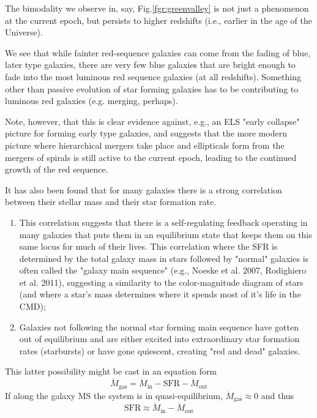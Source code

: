 \par The bimodality we observe in, say, Fig.\ref{fgr:greenvalley}  is not just a phenomenon at the current epoch, but persists to higher redshifts (i.e., earlier in the age of the Universe).
\par We see that while fainter red-sequence galaxies can come from the fading of blue, later type galaxies, there are very few blue galaxies that are bright enough to fade into the most luminous red sequence galaxies (at all redshifts). Something other than passive evolution of star forming galaxies has to be contributing to luminous red galaxies (e.g. merging, perhaps).
\par Note, however, that this is clear evidence against, e.g., an ELS "early collapse" picture for forming early type galaxies, and suggests that the more modern picture where hierarchical mergers take place and ellipticals form from the mergers of spirals is still active to the current epoch, leading to the continued growth of the red sequence.
\par It has also been found that for many galaxies there is a strong correlation between their stellar mass and their star formation rate.
\begin{enumerate}
    \item This correlation suggests that there is a self-regulating feedback operating in many galaxies that puts them in an equilibrium state that keeps them on this same locus for much of their lives. This correlation where the SFR is determined by the total galaxy mass in stars followed by "normal" galaxies is often called the "galaxy main sequence" (e.g., Noeske et al. 2007, Rodighiero et al. 2011), suggesting a similarity to the color-magnitude diagram of stars (and where a star's mass determines where it spends most of it's life in the CMD);
    \item Galaxies not following the normal star forming main sequence have gotten out of equilibrium and are either excited into extraordinary star formation rates (starbursts) or have gone quiescent, creating "red and dead" galaxies.
\end{enumerate}
This latter possibility might be cast in an equation form
\begin{equation*}
    \dot{M}_{\text{gas}} = \dot{M}_{\text{in}}-\text{SFR}-\dot{M}_{\text{out}}
\end{equation*}
If along the galaxy MS the system is in quasi-equilibrium, $\dot{M}_{\text{gas}}\approx 0$ and thus
\begin{equation*}
    \text{SFR}\approx \dot{M}_{\text{in}} -\dot{M}_{\text{out}}
\end{equation*}

